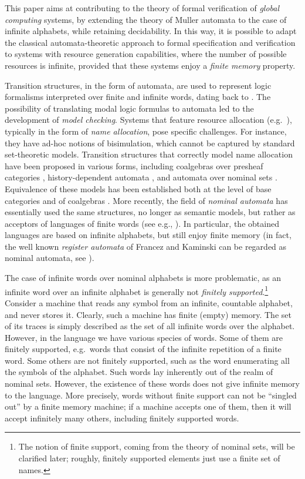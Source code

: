 

This paper aims at contributing to the theory of formal verification of \emph{global computing} systems, by extending the theory of Muller automata to the case of infinite alphabets, while retaining decidability. In this way, it is possible to adapt the classical automata-theoretic approach to formal specification and verification \cite{ClarkeS01} to systems with resource generation capabilities, where the number of possible resources is infinite, provided that these systems enjoy a \emph{finite memory} property. 

Transition structures, in the form of automata, are used to represent logic formalisms interpreted over finite and infinite words, dating back to \cite{Buchi60,Elgot61}. The possibility of translating modal logic formulas to automata led to the development of \emph{model checking}. 
%
Systems that feature resource allocation (e.g.\ \cite{MilnerPW92}), typically in the form of \emph{name allocation}, pose specific challenges. For instance, they have ad-hoc notions of bisimulation, which cannot be captured by standard set-theoretic models. Transition structures that correctly model name allocation have been proposed in various forms, including coalgebras over presheaf categories \cite{FioreT01,BonchiBCG11,Miculan08,GhaniYV04,SammartinoM14}, history-dependent automata \cite{MontanariP05}, and automata over nominal sets \cite{BojanczykKL11}. Equivalence of these models has been established both at the level of base categories \cite{GadducciMM06,FioreS06,CianciaKM10} and of coalgebras \cite{CianciaM10}. More recently, the field of \emph{nominal automata} has essentially used the same structures, no longer as semantic models, but rather as acceptors of languages of finite words (see e.g., \cite{Tze11,KST12,GC11,BojanczykKL11}). In particular, the obtained languages are based on infinite alphabets, but still enjoy finite memory (in fact, the well known \emph{register automata} of Francez and Kaminski can be regarded as nominal automata, see \cite{BojanczykKL11}). 


The case of infinite words over nominal alphabets is more problematic, as an infinite word over an infinite alphabet is generally not \emph{finitely supported}.\footnote{The notion of finite support, coming from the theory of nominal sets, will be clarified later; roughly, finitely supported elements just use a finite set of names.} Consider a machine that reads any symbol from an infinite, countable alphabet, and never stores it. Clearly, such a machine has finite (empty) memory. The set of its traces is simply described as the set of all infinite words over the alphabet. However, in the language we have various species of words. Some of them are finitely supported, e.g.\ words that consist of the infinite repetition of a finite word. Some others are not finitely supported, such as the word enumerating all the symbols of the alphabet. Such words lay inherently out of the realm of nominal sets. However, the existence of these words does not give infinite memory to the language. More precisely, words without finite support can not be ``singled out'' by a finite memory machine; if a machine accepts one of them, then it will accept infinitely many others, including finitely supported words.  

